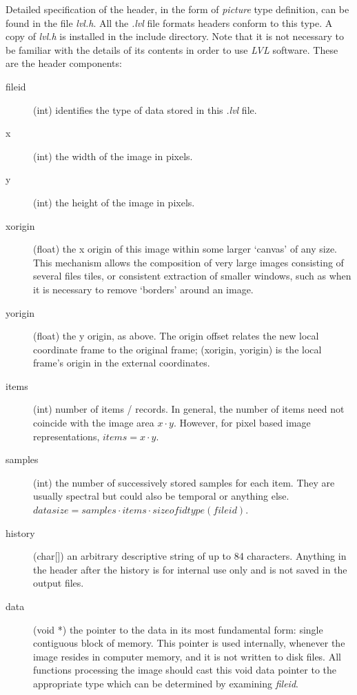 \documentclass[11pt,twoside,english,a4paper]{article}
\begin{document}
Detailed specification of the header, in the form of \emph{picture} type definition, 
can be found in the file \emph{lvl.h}. All the \emph{.lvl} file formats headers conform to this type.
A copy of \emph{lvl.h} is installed in the 
include directory. Note that it is not necessary to be familiar with
the details of its contents in order to use \emph{LVL} software. 
These are the header components:
\begin{description}
\item[fileid] (int) identifies the type of data stored in this \emph{.lvl} file.

\item[x] (int) the width of the image in pixels. 

\item[y] (int) the height of the image in pixels.
 
\item[xorigin] (float) the x origin of this image within some larger
`canvas' of any size. This mechanism allows the composition of very
large images consisting of several files tiles, or consistent extraction of smaller
windows, such as when it is necessary to remove `borders'
around an image.

\item[yorigin] (float) the y origin, as above. 
The origin offset relates the new local coordinate frame to the original frame; 
(xorigin, yorigin) is the local frame's origin in the external coordinates. 

\item[items] (int) number of items / records. In general,  the number of items need not coincide
with the image area $x \cdot y$. However, for pixel based image representations, $items = x \cdot y$.

\item[samples] (int) the number of successively stored samples for each item. 
They are usually spectral but could also be temporal or anything else. 
$datasize = samples \cdot items \cdot sizeofidtype(fileid)$.

\item[history] (char[]) an arbitrary descriptive string of up to 84 characters. 
Anything in the header after the history is for internal use only and is not saved in the output files.

\item[data] (void *) the pointer to the data in its most fundamental form: single contiguous block of memory.
 This pointer is used internally, whenever the image resides in computer memory, and it is not written to disk files. 
All functions processing the image should cast this void data pointer to the appropriate type
which can be determined by examining \emph{fileid}. 


\end{description}
\end{document}
